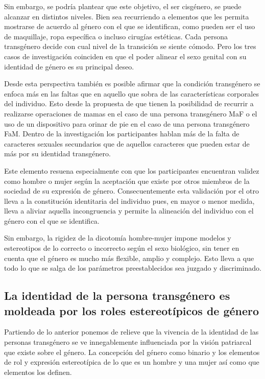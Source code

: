 Sin embargo, se podría plantear que este objetivo, el ser cisgénero, se puede
alcanzar en distintos niveles. Bien sea recurriendo a elementos que les permita
mostrarse de acuerdo al género con el que se identifican, como pueden ser el uso
de maquillaje, ropa específica o incluso cirugías estéticas. Cada persona
transgénero decide con cual nivel de la transición se siente cómodo. Pero los
tres casos de investigación coinciden en que el poder alinear el sexo genital
con su identidad de género es su principal deseo.

Desde esta perspectiva también es posible afirmar que la condición transgénero
se enfoca más en las faltas que en aquello que sobra de las características
corporales del individuo. Esto desde la propuesta de que tienen la posibilidad
de recurrir a realizarse operaciones de mamas en el caso de una persona
transgénero MaF o el uso de un dispositivo para orinar de pie en el caso de una
persona transgénero FaM. Dentro de la investigación los participantes hablan más
de la falta de caracteres sexuales secundarios que de aquellos caracteres que
pueden estar de más por su identidad transgénero.

Este elemento resuena especialmente con que los
participantes encuentran validez como hombre o mujer según la aceptación
que existe por otros miembros de la sociedad de su expresión de género.
Consecuentemente esta validación por el otro lleva a la constitución
identitaria del individuo pues, en mayor o menor medida, lleva a aliviar
aquella incongruencia y permite la alineación del individuo con el género con el
que se identifica.

Sin embargo, la rigidez de la dicotomía hombre-mujer impone modelos y
estereotipos de lo correcto o incorrecto según el sexo biológico, sin tener en
cuenta que el género es mucho más flexible, amplio y complejo. Esto lleva a que
todo lo que se salga de los parámetros preestablecidos sea juzgado y
discriminado.

\subsection[La identidad es moldeada por el patriarcado]{La identidad de la persona
transgénero es moldeada por los roles estereotípicos de género}

Partiendo de lo anterior ponemos de relieve que la vivencia de la identidad de
las personas transgénero se ve innegablemente influenciada por la visión
patriarcal que existe sobre el género. La concepción del género como binario y
los elementos de rol y expresión estereotípica de lo que es un hombre y una
mujer así como que elementos los definen.

